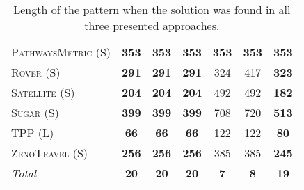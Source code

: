 \documentclass[11pt]{article}
\begin{document}
\begin{table}[tb]
{\begin{tabular}{|l||ccc||ccc||}
\textsc{PathwaysMetric} (S)&\textbf{353}&\textbf{353}&\textbf{353}&\textbf{353}&\textbf{353}&\textbf{353}\\
\textsc{Rover} (S)&\textbf{291}&\textbf{291}&\textbf{291}&324&417&\textbf{323}\\
\textsc{Satellite} (S)&\textbf{204}&\textbf{204}&\textbf{204}&492&492&\textbf{182}\\
\textsc{Sugar} (S)&\textbf{399}&\textbf{399}&\textbf{399}&708&720&\textbf{513}\\
\textsc{TPP} (L)&\textbf{66}&\textbf{66}&\textbf{66}&122&122&\textbf{80}\\
\textsc{ZenoTravel} (S)&\textbf{256}&\textbf{256}&\textbf{256}&385&385&\textbf{245}
\\\hline
\textit{Total}&\textbf{20}&\textbf{20}&\textbf{20}&\textbf{7}&\textbf{8}&\textbf{19}\\\hline

        \end{tabular}}
        \caption{Length of the pattern when the solution was found in all three presented approaches.}
        \label{tab:exp-search}
        \end{table}
        
\end{document}
